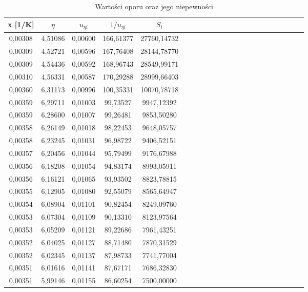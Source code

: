 \documentclass[10pt,a4paper]{article}
\begin{document}
\begin{center}
 \begin{center}
 \begin{table}[h!]
 \centering
 \caption{Wartości oporu oraz jego niepewności}
 \label{t4}
 \begin{tabular}{|c|c|c|c|c|c|c|c|c|c|c|c|c|c|c|c|c|c|c|c|c|c|}
 \hline
 x [1/K] & $\eta$ & $u_{\eta i}$ & $1/u_{\eta i}$       & $S_{i}$\\ \hline
0,00308  & 4,51086   & 0,00600 & 166,61377 & 27760,14732              \\ \hline
0,00309  & 4,52721   & 0,00596 & 167,76408 & 28144,78770              \\ \hline
0,00309  & 4,54436   & 0,00592 & 168,96743 & 28549,99171              \\ \hline
0,00310  & 4,56331   & 0,00587 & 170,29288 & 28999,66403              \\ \hline
0,00360  & 6,31173   & 0,00996 & 100,35331 & 10070,78718              \\ \hline
0,00359  & 6,29711   & 0,01003 & 99,73527  & 9947,12392               \\ \hline
0,00359  & 6,28600   & 0,01007 & 99,26481  & 9853,50280               \\ \hline
0,00358  & 6,26149   & 0,01018 & 98,22453  & 9648,05757               \\ \hline
0,00358  & 6,23245   & 0,01031 & 96,98722  & 9406,52151               \\ \hline
0,00357  & 6,20456   & 0,01044 & 95,79499  & 9176,67988               \\ \hline
0,00356  & 6,18208   & 0,01054 & 94,83174  & 8993,05911               \\ \hline
0,00356  & 6,16121   & 0,01065 & 93,93502  & 8823,78815               \\ \hline
0,00355  & 6,12905   & 0,01080 & 92,55079  & 8565,64947               \\ \hline
0,00354  & 6,08904   & 0,01101 & 90,82454  & 8249,09760               \\ \hline
0,00353  & 6,07304   & 0,01109 & 90,13310  & 8123,97564               \\ \hline
0,00353  & 6,05209   & 0,01121 & 89,22686  & 7961,43251               \\ \hline
0,00352  & 6,04025   & 0,01127 & 88,71480  & 7870,31529               \\ \hline
0,00352  & 6,02345   & 0,01137 & 87,98733  & 7741,77004               \\ \hline
0,00351  & 6,01616   & 0,01141 & 87,67171  & 7686,32830               \\ \hline
0,00351  & 5,99146   & 0,01155 & 86,60254  & 7500,00000               \\ \hline
 \end{tabular}
 \end{table}
 \end{center}
 

\end{center}
\end{document}
